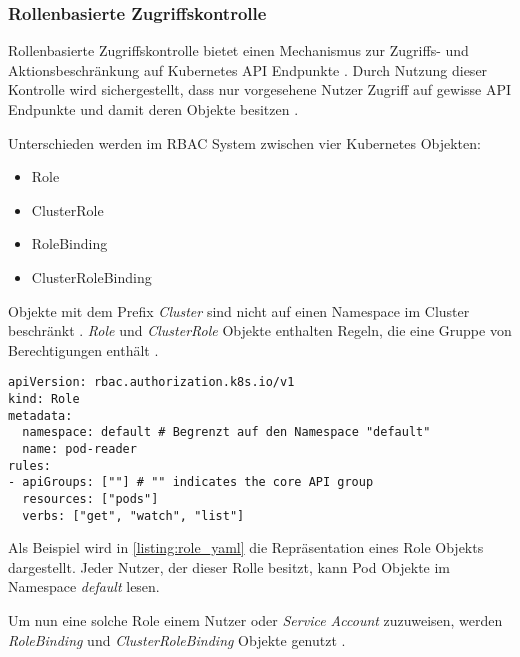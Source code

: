 \subsubsection{Rollenbasierte Zugriffskontrolle}
\label{subsec:kubernetes:rbac}
Rollenbasierte Zugriffskontrolle bietet einen Mechanismus zur Zugriffs- und Aktionsbeschränkung auf Kubernetes API Endpunkte \cite{kubernetesRbac}.
Durch Nutzung dieser Kontrolle wird sichergestellt, dass nur vorgesehene Nutzer Zugriff auf gewisse API Endpunkte und damit deren
Objekte besitzen \cite{Burns2019}.

Unterschieden werden im \ac{RBAC} System zwischen vier Kubernetes Objekten:
\begin{itemize}
  \item Role
  \item ClusterRole
  \item RoleBinding
  \item ClusterRoleBinding
\end{itemize}

Objekte mit dem Prefix \emph{Cluster} sind nicht auf einen Namespace im Cluster beschränkt \cite{kubernetesRbac}.
\emph{Role} und \emph{ClusterRole} Objekte enthalten Regeln, die eine Gruppe von Berechtigungen enthält \cite{kubernetesRbac}.

\begin{lstlisting}[caption=Repräsentation eines Role Objekts in YAML, label=listing:role_yaml]
apiVersion: rbac.authorization.k8s.io/v1
kind: Role
metadata:
  namespace: default # Begrenzt auf den Namespace "default"
  name: pod-reader
rules:
- apiGroups: [""] # "" indicates the core API group
  resources: ["pods"]
  verbs: ["get", "watch", "list"]
\end{lstlisting}

Als Beispiel wird in \ref{listing:role_yaml} die Repräsentation eines Role Objekts dargestellt. 
Jeder Nutzer, der dieser Rolle besitzt, kann Pod Objekte im Namespace \emph{default} lesen.


Um nun eine solche Role einem Nutzer oder \emph{Service Account} zuzuweisen,
werden \emph{RoleBinding} und \emph{ClusterRoleBinding} Objekte genutzt \cite{Burns2019}.
